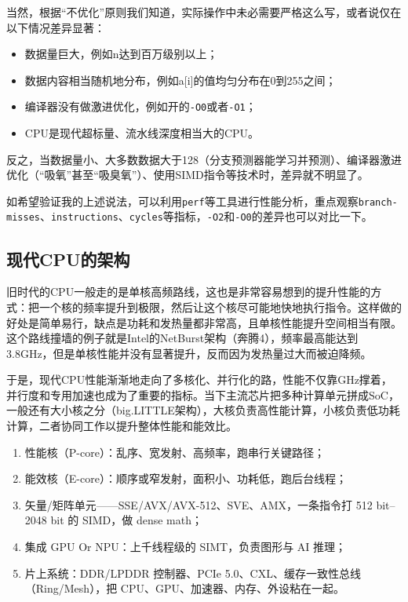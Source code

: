 \begin{tip}
  当然，根据“不优化”原则我们知道，实际操作中未必需要严格这么写，或者说仅在以下情况差异显著：
\begin{itemize}
  \item 数据量巨大，例如n达到百万级别以上；
  \item 数据内容相当随机地分布，例如a[i]的值均匀分布在0到255之间；
  \item 编译器没有做激进优化，例如开的\texttt{-O0}或者\texttt{-O1}；
  \item CPU是现代超标量、流水线深度相当大的CPU。
\end{itemize}
反之，当数据量小、大多数数据大于128（分支预测器能学习并预测）、编译器激进优化（“吸氧”甚至“吸臭氧”）、使用SIMD指令等技术时，差异就不明显了。

如希望验证我的上述说法，可以利用\texttt{perf}等工具进行性能分析，重点观察\texttt{branch-misses}、\texttt{instructions}、\texttt{cycles}等指标，\texttt{-O2}和\texttt{-O0}的差异也可以对比一下。
\end{tip}

\subsection{现代CPU的架构}

旧时代的CPU一般走的是单核高频路线，这也是非常容易想到的提升性能的方式：把一个核的频率提升到极限，然后让这个核尽可能地快地执行指令。这样做的好处是简单易行，缺点是功耗和发热量都非常高，且单核性能提升空间相当有限。这个路线撞墙的例子就是Intel的NetBurst架构（奔腾4），频率最高能达到3.8GHz，但是单核性能并没有显著提升，反而因为发热量过大而被迫降频。

于是，现代CPU性能渐渐地走向了多核化、并行化的路，性能不仅靠GHz撑着，并行度和专用加速也成为了重要的指标。当下主流芯片把多种计算单元拼成SoC，一般还有大小核之分（big.LITTLE架构），大核负责高性能计算，小核负责低功耗计算，二者协同工作以提升整体性能和能效比。

\begin{enumerate}
\item 性能核（P-core）：乱序、宽发射、高频率，跑串行关键路径；
\item 能效核（E-core）：顺序或窄发射，面积小、功耗低，跑后台线程；
\item 矢量/矩阵单元——SSE/AVX/AVX-512、SVE、AMX，一条指令打 512 bit–2048 bit 的 SIMD，做 dense math；
\item 集成 GPU Or NPU：上千线程级的 SIMT，负责图形与 AI 推理；
\item 片上系统：DDR/LPDDR 控制器、PCIe 5.0、CXL、缓存一致性总线（Ring/Mesh），把 CPU、GPU、加速器、内存、外设粘在一起。
\end{enumerate}

